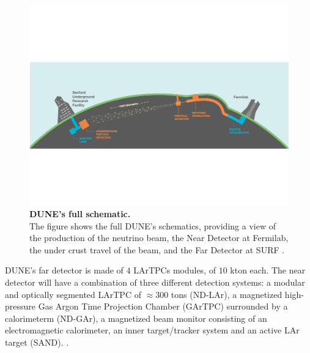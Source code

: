 \begin{figure}[h!]
	\begin{center}
		\includegraphics[scale=0.6]{Figures/DUNE_full_schematic.pdf}
		\caption[DUNE's full schematic]{ {\textbf{DUNE's full schematic.}} \\The figure shows the full DUNE's schematics, providing a view of the production of the neutrino beam, the Near Detector at Fermilab, the under crust travel of the beam, and the Far Detector at SURF \cite{dune_snowmass_22}.}
		\label{DUNE_full_schematic}	
	\end{center}
\end{figure}

DUNE's far detector is made of $4$ LArTPCs modules, of $10$ kton each. The near detector will have a combination of three different detection systems: a modular and optically segmented LArTPC of $\approx300$ tons (ND-LAr), a magnetized high-pressure Gas Argon Time Projection Chamber (GArTPC) surrounded by a calorimeterm (ND-GAr), a magnetized beam monitor consisting of an electromagnetic calorimeter, an inner target/tracker system and an active LAr target (SAND). \cite{dune_snowmass_22, dune_SAND}.